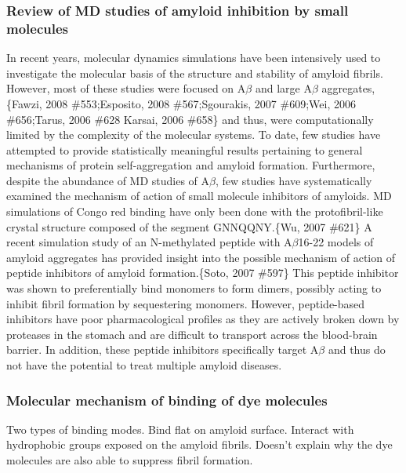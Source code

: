\subsubsection{Review of MD studies of amyloid inhibition by small molecules}
\1 In recent years, molecular dynamics simulations have been intensively used to investigate the molecular basis of the structure and stability of amyloid fibrils. However, most of these studies were focused on A$\beta$ and large A$\beta$ aggregates,\{Fawzi, 2008 \#553;Esposito, 2008 \#567;Sgourakis, 2007 \#609;Wei, 2006 \#656;Tarus, 2006 \#628 Karsai, 2006 \#658\} and thus, were computationally limited by the complexity of the molecular systems. To date, few studies have attempted to provide statistically meaningful results pertaining to general mechanisms of protein self-aggregation and amyloid formation. Furthermore, despite the abundance of MD studies of A$\beta$, few studies have systematically examined the mechanism of action of small molecule inhibitors of amyloids. MD simulations of Congo red binding have only been done with the protofibril-like crystal structure composed of the segment GNNQQNY.\{Wu, 2007 \#621\} A recent simulation study of an N-methylated peptide with A$\beta$16-22 models of amyloid aggregates has provided insight into the possible mechanism of action of peptide inhibitors of amyloid formation.\{Soto, 2007 \#597\} This peptide inhibitor was shown to preferentially bind monomers to form dimers, possibly acting to inhibit fibril formation by sequestering monomers. However, peptide-based inhibitors have poor pharmacological profiles as they are actively broken down by proteases in the stomach and are difficult to transport across the blood-brain barrier. In addition, these peptide inhibitors specifically target A$\beta$ and thus do not have the potential to treat multiple amyloid diseases.

\subsubsection{Molecular mechanism of binding of dye molecules}
Two types of binding modes. Bind flat on amyloid surface. Interact with hydrophobic groups exposed on the amyloid fibrils.
Doesn't explain why the dye molecules are also able to suppress fibril formation.


% 
% 



